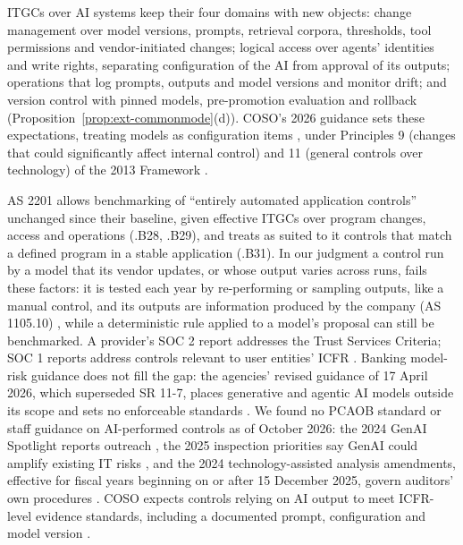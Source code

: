 ITGCs over AI systems keep their four domains with new objects: change management over model versions, prompts, retrieval corpora, thresholds, tool permissions and vendor-initiated changes; logical access over agents' identities and write rights, separating configuration of the AI from approval of its outputs; operations that log prompts, outputs and model versions and monitor drift; and version control with pinned models, pre-promotion evaluation and rollback (Proposition~\ref{prop:ext-commonmode}(d)). COSO's 2026 guidance sets these expectations, treating models as configuration items \citep{coso2026genai}, under Principles 9 (changes that could significantly affect internal control) and 11 (general controls over technology) of the 2013 Framework \citep{coso2013framework}.

\begin{remark}\label{rem:acct-evidence}
AS 2201 allows benchmarking of ``entirely automated application controls'' unchanged since their baseline, given effective ITGCs over program changes, access and operations (.B28, .B29), and treats as suited to it controls that match a defined program in a stable application (.B31). In our judgment a control run by a model that its vendor updates, or whose output varies across runs, fails these factors: it is tested each year by re-performing or sampling outputs, like a manual control, and its outputs are information produced by the company (AS 1105.10) \citep{pcaob2026as1105}, while a deterministic rule applied to a model's proposal can still be benchmarked. A provider's SOC 2 report addresses the Trust Services Criteria; SOC 1 reports address controls relevant to user entities' ICFR \citep{aicpa2026soc1}. Banking model-risk guidance does not fill the gap: the agencies' revised guidance of 17 April 2026, which superseded SR 11-7, places generative and agentic AI models outside its scope and sets no enforceable standards \citep{fed2026sr262,occ2026bulletin13}. We found no PCAOB standard or staff guidance on AI-performed controls as of October 2026: the 2024 GenAI Spotlight reports outreach \citep{pcaob2024genai}, the 2025 inspection priorities say GenAI could amplify existing IT risks \citep{pcaob2024priorities}, and the 2024 technology-assisted analysis amendments, effective for fiscal years beginning on or after 15 December 2025, govern auditors' own procedures \citep{pcaob2024release007}. COSO expects controls relying on AI output to meet ICFR-level evidence standards, including a documented prompt, configuration and model version \citep{coso2026genai}.
\end{remark}

